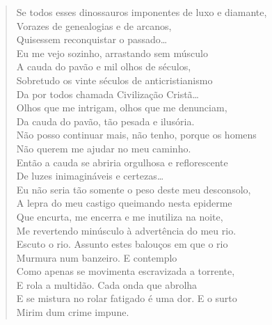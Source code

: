 {\begin{verse}
Se todos esses dinossauros imponentes de luxo e diamante,\\
Vorazes de genealogias e de arcanos,\\
Quisessem reconquistar o passado\ldots{}\\
Eu me vejo sozinho, arrastando sem músculo\\
A cauda do pavão e mil olhos de séculos,\\
Sobretudo os vinte séculos de anticristianismo\\
Da por todos chamada Civilização Cristã\ldots{}\\
Olhos que me intrigam, olhos que me denunciam,\\
Da cauda do pavão, tão pesada e ilusória.\\
Não posso continuar mais, não tenho, porque os homens\\
Não querem me ajudar no meu caminho.\\
Então a cauda se abriria orgulhosa e reflorescente\\
De luzes inimagináveis e certezas\ldots{}\\
Eu não seria tão somente o peso deste meu desconsolo,\\
A lepra do meu castigo queimando nesta epiderme\\
Que encurta, me encerra e me inutiliza na noite,\\
Me revertendo minúsculo à advertência do meu rio.\\
Escuto o rio. Assunto estes balouços em que o rio\\
Murmura num banzeiro. E contemplo\\
Como apenas se movimenta escravizada a torrente,\\
E rola a multidão. Cada onda que abrolha\\
E se mistura no rolar fatigado é uma dor. E o surto\\
Mirim dum crime impune.


\end{verse}}
